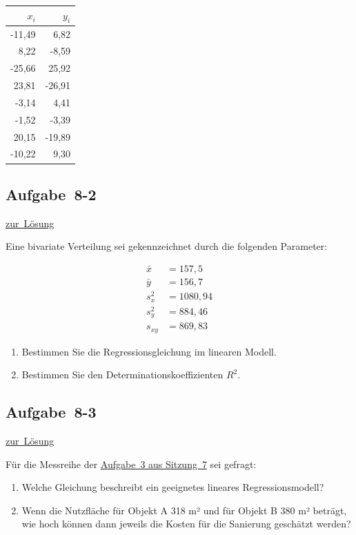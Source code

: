 \documentclass[
  11pt,
  ngerman,
  a4paper,
]{report}
\begin{document}
\begin{table}[H]
\centering
\begin{tabular}{rr}
\toprule
\textbf{$x_i$} & \textbf{$y_i$}\\
\midrule
-11,49 & 6,82\\
8,22 & -8,59\\
-25,66 & 25,92\\
23,81 & -26,91\\
-3,14 & 4,41\\
-1,52 & -3,39\\
20,15 & -19,89\\
-10,22 & 9,30\\
\bottomrule
\end{tabular}
\end{table}

\hypertarget{aufgabe-8-2}{%
\subsection{Aufgabe~8-2}\label{aufgabe-8-2}}

\protect\hyperlink{loesung-8-2}{zur~Lösung}

Eine bivariate Verteilung sei gekennzeichnet durch die folgenden Parameter:

\[
\begin{aligned}
\bar{x}&=157,5\\
\bar{y}&=156,7\\
s^2_{x}&=1080,94\\
s^2_{y}&=884,46\\
s_{xy}&=869,83
\end{aligned}
\]

\begin{enumerate}
\def\labelenumi{\alph{enumi})}
\item
  Bestimmen Sie die Regressionsgleichung im linearen Modell.
\item
  Bestimmen Sie den Determinationskoeffizienten \(R^2\).
\end{enumerate}

\hypertarget{aufgabe-8-3}{%
\subsection{Aufgabe~8-3}\label{aufgabe-8-3}}

\protect\hyperlink{loesung-8-3}{zur~Lösung}

Für die Messreihe der \protect\hyperlink{aufgabe-7-3}{Aufgabe~3 aus Sitzung~7} sei gefragt:

\begin{enumerate}
\def\labelenumi{\alph{enumi})}
\item
  Welche Gleichung beschreibt ein geeignetes lineares Regressionsmodell?
\item
  Wenn die Nutzfläche für Objekt A 318 m² und für Objekt B 380 m² beträgt, wie hoch können dann jeweils die Kosten für die Sanierung geschätzt werden?
\end{enumerate}
\end{document}
